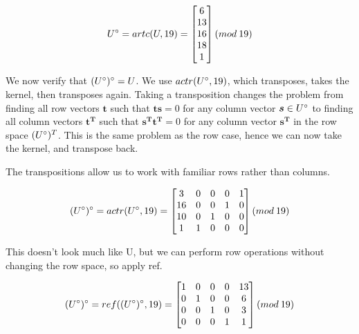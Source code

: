 \documentclass[10pt,a4paper]{report}
\begin{document}
\begin{equation*}
U\degree=artc(U,19)=\begin{bmatrix}
6\\
13\\
16\\
18\\
1\\
\end{bmatrix} (mod \: 19)
\end{equation*}

\vspace{5mm}

We now verify that $(U\degree)\degree = U$. We use $actr(U\degree,19)$, which transposes, takes the kernel, then transposes again. Taking a transposition changes the problem from finding all row vectors $\bm{t}$ such that $\bm{ts}=0$ for any column vector $\bm{s} \in U\degree$ to finding all column vectors $\bm{t^T}$ such that $\bm{s^T  t^T}=0$ for any column vector $\bm{s^T}$ in the row space $(U\degree)^T$. This is the same problem as the row case, hence we can now take the kernel, and transpose back.

The transpositions allow us to work with familiar rows rather than columns.

\vspace{5mm}

\begin{equation*}
(U\degree)\degree = actr(U\degree,19) = \begin{bmatrix}
3 & 0 & 0 & 0 & 1 \\
16 & 0 & 0 & 1 & 0\\
10 & 0 & 1 & 0 & 0\\
1 & 1 & 0 & 0 & 0\\
\end{bmatrix} (mod \: 19)
\end{equation*}

\vspace{5mm}

This doesn't look much like U, but we can perform row operations without changing the row space, so apply ref.

\vspace{5mm}

\begin{equation*}
(U\degree)\degree = ref((U\degree)\degree,19) = \begin{bmatrix}
1 & 0 & 0 & 0 & 13 \\
0 & 1 & 0 & 0 & 6\\
0 & 0 & 1 & 0 & 3\\
0 & 0 & 0 & 1 & 1\\
\end{bmatrix} (mod \: 19)
\end{equation*}
\end{document}

